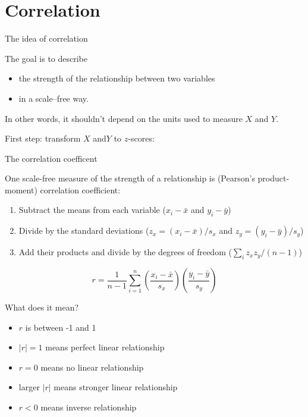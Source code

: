 \section{Correlation}

\begin{frame}{The idea of correlation}

  The goal is to describe
  \begin{itemize}
    \item the strength of the relationship between two variables
    \item in a \alert{scale--free} way.
  \end{itemize}
  In other words, it shouldn't depend on the units used to measure $X$ and $Y$.

    \vspace{2em}

    First step: \alert{transform} $X$ and$Y$ to $z$-scores: \\

\end{frame}

\begin{frame}{The correlation coefficent}

  One scale-free measure of the strength of a relationship is (Pearson's product-moment) \alert{correlation coefficient}:
  \begin{enumerate}
    \item Subtract the means from each variable ($x_i-\bar x$ and $y_i-\bar y$)
    \item Divide by the standard deviations ($z_x=(x_i-\bar x)/s_x$ and $z_y=(y_i-\bar y)/s_y$)
    \item Add their products and divide by the degrees of freedom ($\sum_i z_x z_y / (n-1)$)
  \end{enumerate}
  \[
    r = \frac{1}{n-1} \sum_{i=1}^n \left(\frac{x_i-\bar x}{s_x}\right)\left(\frac{y_i-\bar y}{s_y}\right)
  \]

\end{frame}

\begin{frame}{What does it mean?}
  \begin{itemize}
    \item $r$ is between -1 and 1
    \item $|r|=1$ means perfect \alert{linear} relationship
    \item $r=0$ means no linear relationship
    \item larger $|r|$ means stronger linear relationship
    \item $r<0$ means inverse relationship
  \end{itemize}

  \begin{center}
  \end{center}

\end{frame}

